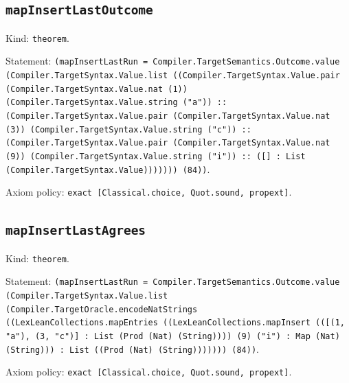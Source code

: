 \documentclass[11pt]{article}
\begin{document}
\subsection*{\texttt{mapInsertLastOutcome}}
\noindent Kind: \texttt{theorem}.\par
\noindent Statement: \texttt{(mapInsertLastRun = Compiler.TargetSemantics.Outcome.value (Compiler.TargetSyntax.Value.list ((Compiler.TargetSyntax.Value.pair (Compiler.TargetSyntax.Value.nat (1)) (Compiler.TargetSyntax.Value.string ("a")) :: (Compiler.TargetSyntax.Value.pair (Compiler.TargetSyntax.Value.nat (3)) (Compiler.TargetSyntax.Value.string ("c")) :: (Compiler.TargetSyntax.Value.pair (Compiler.TargetSyntax.Value.nat (9)) (Compiler.TargetSyntax.Value.string ("i")) :: ([] : List (Compiler.TargetSyntax.Value))))))) (84))}.\par
\noindent Axiom policy: \texttt{exact [Classical.choice, Quot.sound, propext]}.\par
\subsection*{\texttt{mapInsertLastAgrees}}
\noindent Kind: \texttt{theorem}.\par
\noindent Statement: \texttt{(mapInsertLastRun = Compiler.TargetSemantics.Outcome.value (Compiler.TargetSyntax.Value.list (Compiler.TargetOracle.encodeNatStrings ((LexLeanCollections.mapEntries ((LexLeanCollections.mapInsert (([(1, "a"), (3, "c")] : List (Prod (Nat) (String)))) (9) ("i") : Map (Nat) (String))) : List ((Prod (Nat) (String))))))) (84))}.\par
\noindent Axiom policy: \texttt{exact [Classical.choice, Quot.sound, propext]}.\par
\end{document}
